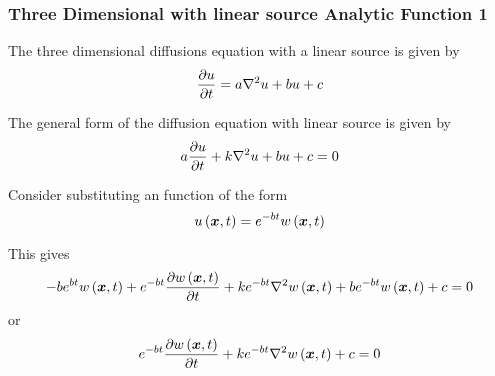 \subsubsection{Three Dimensional with linear source Analytic Function 1}

The three dimensional diffusions equation with a linear source is given by
\begin{equation}
  \delby{u}{t}=a\laplacian{}{u}+bu+c
\end{equation}

The general form of the \OpenCMISS diffusion equation with linear source is
given by
\begin{equation}
  a\delby{u}{t}+k\laplacian{}{u}+bu+c=0
\end{equation}

Consider substituting an function of the form
\begin{equation}
   u\left(  \boldsymbol{x} ,t \right) =e^{-bt} w\left(  \boldsymbol{x} ,t \right) 
\end{equation}

This gives
\begin{equation}
  -be^{bt}\fnof{w}{\vectr{x},t}+e^{-bt}\delby{\fnof{w}{\vectr{x},t}}{t}+ke^{-bt}\laplacian{}{\fnof{w}{\vectr{x},t}}+be^{-bt}\fnof{w}{\vectr{x},t}+c=0
\end{equation}
or
\begin{equation}
  e^{-bt}\delby{\fnof{w}{\vectr{x},t}}{t}+ke^{-bt}\laplacian{}{\fnof{w}{\vectr{x},t}}+c=0
\end{equation}
  

